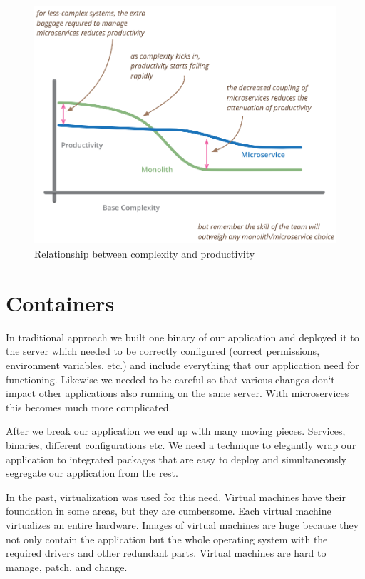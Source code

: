 \documentclass[12pt,oneside]{fithesis2}
\begin{document}
\begin{figure}[ht!]
	\label{productivity}
	\centering
	\includegraphics[width=\textwidth]{images/complexity_productivity.png}
	\caption{Relationship between complexity and productivity\footnotemark}
\end{figure}


\section{Containers}

In traditional approach we built one binary of our application and deployed it to the server which needed to be correctly configured (correct permissions, environment variables, etc.) and include everything that our application need for functioning. Likewise we needed to be careful so that various changes don`t impact other applications also running on the same server. With microservices this becomes much more complicated.

After we break our application we end up with many moving pieces. Services, binaries, different configurations etc. We need a technique to elegantly wrap our application to integrated packages that are easy to deploy and simultaneously segregate our application from the rest.

In the past, virtualization was used for this need. Virtual machines have their foundation in some areas, but they are cumbersome. Each virtual machine virtualizes an entire hardware. Images of virtual machines are huge because they not only contain the application but the whole operating system with the required drivers and other redundant parts. Virtual machines are hard to manage, patch, and change.
\end{document}
